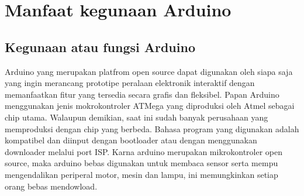 \section{Manfaat kegunaan Arduino}
	\subsection{Kegunaan atau fungsi Arduino}
	    Arduino yang merupakan platfrom open source dapat digunakan oleh siapa saja yang ingin merancang prototipe peralaan elektronik interaktif dengan memanfaatkan fitur yang tersedia secara grafis dan fleksibel. Papan Arduino menggunakan jenis mokrokontroler ATMega yang diproduksi oleh Atmel sebagai chip utama. Walaupun demikian, saat ini sudah banyak perusahaan yang memproduksi dengan chip yang berbeda. Bahasa program yang digunakan adalah kompatibel dan diinput dengan bootloader atau dengan menggunakan downloader melalui port ISP. Karna arduino merupakan mikrokontroler open source, maka arduino bebas digunakan untuk membaca sensor serta mempu mengendalikan periperal motor, mesin dan lampu, ini memungkinkan setiap orang bebas mendowload.
	